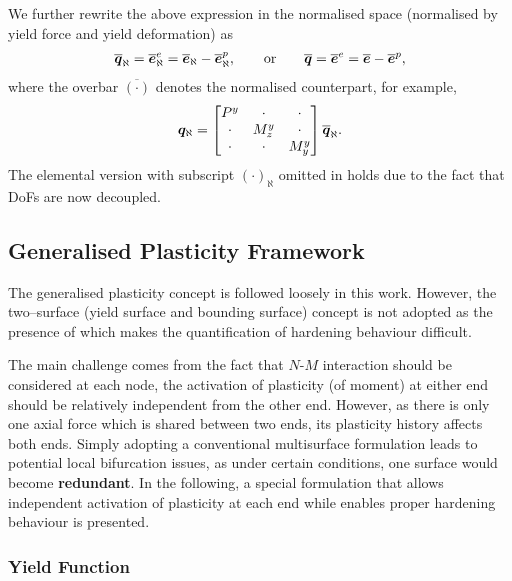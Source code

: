 We further rewrite the above expression in the normalised space (normalised by yield force and yield deformation) as
\begin{gather}\label{eq:new_kin}
\bm{\overline{q}}_\aleph=\overline{\bm{e}}_\aleph^e=\overline{\bm{e}}_\aleph-\overline{\bm{e}}_\aleph^p,\qquad\text{or}\qquad
\bm{\overline{q}}=\overline{\bm{e}}^e=\overline{\bm{e}}-\overline{\bm{e}}^p,
\end{gather}
where the overbar $\overline{\left(\cdot\right)}$ denotes the normalised counterpart, for example,
\begin{gather}\label{eq:nm_normalisedq}
\bm{q}_\aleph=\begin{bmatrix}
P^y&\cdot&\cdot\\\cdot&M_z^y&\cdot\\\cdot&\cdot&M_y^y
\end{bmatrix}\bm{\overline{q}}_\aleph.
\end{gather}
The elemental version with subscript $\left(\cdot\right)_\aleph$ omitted in  holds due to the fact that DoFs are now decoupled.
\subsection{Generalised Plasticity Framework}
The generalised plasticity concept \cite{Auricchio1994} is followed loosely in this work.
However, the two--surface (yield surface and bounding surface) concept is not adopted as the presence of which makes the quantification of hardening behaviour difficult.

The main challenge comes from the fact that $N$-$M$ interaction should be considered at each node, the activation of plasticity (of moment) at either end should be relatively independent from the other end.
However, as there is only one axial force which is shared between two ends, its plasticity history affects both ends.
Simply adopting a conventional multisurface formulation \cite{Simo1998} leads to potential local bifurcation issues, as under certain conditions, one surface would become \textbf{redundant}.
In the following, a special formulation that allows independent activation of plasticity at each end while enables proper hardening behaviour is presented.
\subsubsection{Yield Function}
